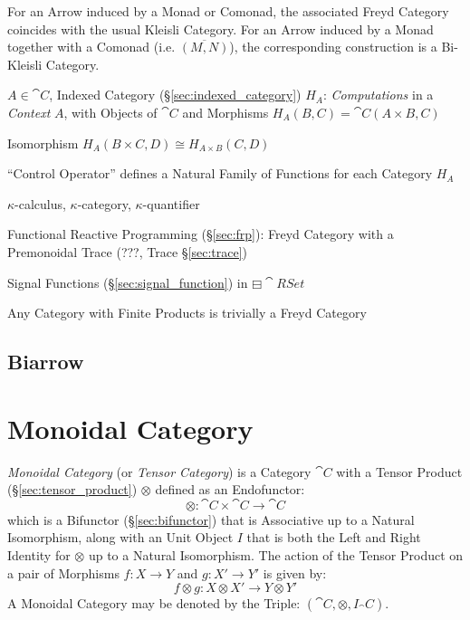 For an Arrow induced by a Monad or Comonad, the associated Freyd
Category coincides with the usual Kleisli Category. For an Arrow
induced by a Monad together with a Comonad (i.e. $\overline{(M,N)}$),
the corresponding construction is a Bi-Kleisli Category.
\cite{jacobs-heunen-hasuo09}

$A \in \cat{C}$, Indexed Category (\S\ref{sec:indexed_category})
$H_A$: \emph{Computations} in a \emph{Context} $A$, with Objects of
$\cat{C}$ and Morphisms $H_A(B,C) = \cat{C}(A \times B, C)$

Isomorphism $H_A(B \times C, D) \cong H_{A \times B} (C,D)$

``Control Operator'' defines a Natural Family of Functions for each
Category $H_A$
\cite{paterson01}

$\kappa$-calculus, $\kappa$-category, $\kappa$-quantifier %

Functional Reactive Programming (\S\ref{sec:frp}): Freyd Category with
a Premonoidal Trace (???, Trace \S\ref{sec:trace})

Signal Functions (\S\ref{sec:signal_function}) in
$\boxminus\cat{RSet}$ \cite{jeffrey12}

Any Category with Finite Products is trivially a Freyd Category
\cite{jeffrey12}



\subsection{Biarrow}\label{sec:biarrow}



\section{Monoidal Category}\label{sec:monoidal_category}

\emph{Monoidal Category} (or \emph{Tensor Category}) is a Category
$\cat{C}$ with a Tensor Product (\S\ref{sec:tensor_product})
$\otimes$ defined as an Endofunctor:
\[
  \otimes : \cat{C} \times \cat{C} \rightarrow \cat{C}
\]
which is a Bifunctor (\S\ref{sec:bifunctor}) that is Associative up to
a Natural Isomorphism, along with an Unit Object $I$ that is both the
Left and Right Identity for $\otimes$ up to a Natural Isomorphism. The
action of the Tensor Product on a pair of Morphisms $f : X \rightarrow
Y$ and $g : X' \rightarrow Y'$ is given by:
\[
  f \otimes g : X \otimes X' \rightarrow Y \otimes Y'
\]
A Monoidal Category may be denoted by the Triple: $(\cat{C},
\otimes, I_\cat{C})$.

